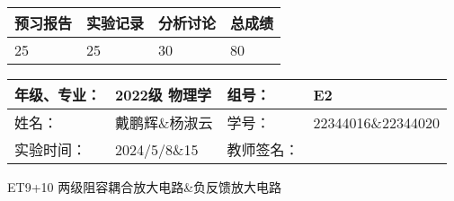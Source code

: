 \documentclass[dvipsnames, svgnames,a4paper,11pt]{article}
\begin{document}
	
	
	
	
	\begin{table}
		\renewcommand\arraystretch{1.7}
		\begin{tabularx}{\textwidth}{
				|X|X|X|X
				|X|X|X|X|}
			\hline
			\multicolumn{2}{|c|}{预习报告}&\multicolumn{2}{|c|}{实验记录}&\multicolumn{2}{|c|}{分析讨论}&\multicolumn{2}{|c|}{总成绩}\\
			\hline
			\LARGE25 & & \LARGE25 & & \LARGE30 & & \LARGE80 & \\
			\hline
		\end{tabularx}
	\end{table}
	
	\begin{table}
		\renewcommand\arraystretch{1.7}
		\begin{tabularx}{\textwidth}{|X|X|X|X|}
			\hline
			年级、专业： & 2022级 物理学 &组号： & E2\\
			\hline
			姓名： & 戴鹏辉\&杨淑云  & 学号： & 22344016\&22344020 \\
			\hline
			实验时间： & 2024/5/8\&15 & 教师签名： & \\
			\hline
		\end{tabularx}
	\end{table}
	
	\begin{center}
		\LARGE ET9+10 \quad 两级阻容耦合放大电路\&负反馈放大电路
	\end{center}
	
	
\end{document}
